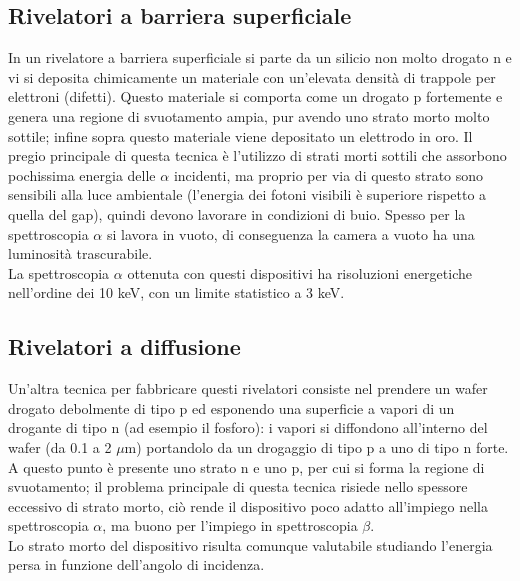 \subsection{Rivelatori a barriera superficiale}
In un rivelatore a barriera superficiale si parte da un silicio non molto drogato n e vi si deposita chimicamente un materiale con un'elevata densit\`a
di trappole per elettroni (difetti).
Questo materiale si comporta come un drogato p fortemente e genera una regione di svuotamento ampia, pur avendo uno strato morto molto sottile; infine sopra questo materiale viene depositato un elettrodo in oro.
Il pregio principale di questa tecnica \`e l'utilizzo di strati morti sottili che assorbono pochissima energia delle $\alpha$ incidenti,
ma proprio per via di questo strato sono sensibili alla luce ambientale (l'energia dei fotoni visibili \`e superiore rispetto a quella del gap), quindi
devono lavorare in condizioni di buio. 
Spesso per la spettroscopia $\alpha$ si lavora in vuoto, di conseguenza la camera a vuoto ha una luminosit\`a trascurabile.\\
La spettroscopia $\alpha$ ottenuta con questi dispositivi ha risoluzioni energetiche nell'ordine dei 10 keV, con un limite statistico a 3 keV.
\subsection{Rivelatori a diffusione}
Un'altra tecnica per fabbricare questi rivelatori consiste nel prendere un wafer drogato debolmente di tipo p ed esponendo una superficie
a vapori di un drogante di tipo n (ad esempio il fosforo): i vapori si diffondono all'interno del wafer (da 0.1 a 2 $\mu$m) portandolo da un
drogaggio di tipo p a uno di tipo n forte.
A questo punto \`e presente uno strato n e uno p, per cui si forma la regione di svuotamento; il problema principale di questa tecnica risiede
nello spessore eccessivo di strato morto, ci\`o rende il dispositivo poco adatto all'impiego nella spettroscopia $\alpha$, ma buono per l'impiego
in spettroscopia $\beta$.\\
Lo strato morto del dispositivo risulta comunque valutabile studiando l'energia persa in funzione dell'angolo di incidenza.
